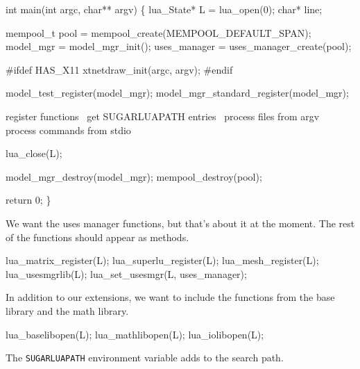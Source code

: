 \nwenddocs{}\endmoddef
int main(int argc, char** argv)
\{
    lua_State* L = lua_open(0);
    char* line;

    mempool_t pool = mempool_create(MEMPOOL_DEFAULT_SPAN);
    model_mgr    = model_mgr_init();
    uses_manager = uses_manager_create(pool);

#ifdef HAS_X11
    xtnetdraw_init(argc, argv);
#endif

    model_test_register(model_mgr);
    model_mgr_standard_register(model_mgr);

    \LA{}register functions~{\nwtagstyle{}}\RA{}
    \LA{}get \code{}SUGAR{}LUA{}PATH\edoc{} entries~{\nwtagstyle{}}\RA{}
    \LA{}process files from argv~{\nwtagstyle{}}\RA{}
    \LA{}process commands from stdio~{\nwtagstyle{}}\RA{}

    lua_close(L);

    model_mgr_destroy(model_mgr);
    mempool_destroy(pool);

    return 0;
\}

\nwendcode{}\nwdocspar

We want the uses manager functions, but that's about it at the moment.
The rest of the functions should appear as methods.

\nwenddocs{}\plusendmoddef
lua_matrix_register(L);
lua_superlu_register(L);
lua_mesh_register(L);
lua_usesmgrlib(L);
lua_set_usesmgr(L, uses_manager);
\nwendcode{}\nwdocspar

In addition to our extensions, we want to include the functions
from the base library and the math library.

\nwenddocs{}\plusendmoddef
lua_baselibopen(L);
lua_mathlibopen(L);
lua_iolibopen(L);
\nwendcode{}\nwdocspar

The {\tt{}SUGAR{}LUA{}PATH} environment variable adds to the search path.

